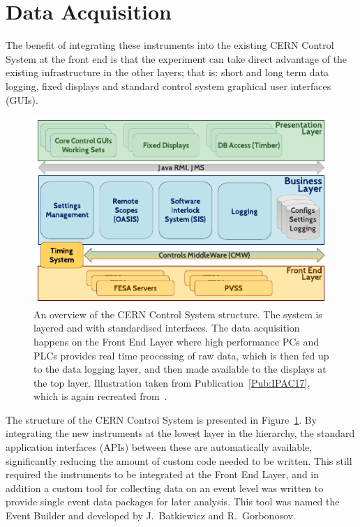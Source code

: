 \section{Data Acquisition}
\label{DAQ:DAQ}

The benefit of integrating these instruments into the existing CERN Control System at the front end is that the experiment can take direct advantage of the existing infrastructure in the other layers; that is: short and long term data logging, fixed displays and standard control system graphical user interfaces (GUIs).

\begin{figure}[hbt]
    \centering
    \includegraphics[width=0.85\linewidth,trim={0mm 0mm 0mm 0mm},clip]{figures/CERNControls}
    \caption{\label{Fig:DAQ:CERN}
        An overview of the CERN Control System structure.
        The system is layered and with standardised interfaces.
        The data acquisition happens on the Front End Layer where high performance PCs and PLCs provides real time processing of raw data, which is then fed up to the data logging layer, and then made available to the displays at the top layer.
        Illustration taken from Publication~\ref{Pub:IPAC17}, which is again recreated from~\cite{add:gorbonosov:2013}.
    }
\end{figure}

The structure of the CERN Control System is presented in Figure~\ref{Fig:DAQ:CERN}.
By integrating the new instruments at the lowest layer in the hierarchy, the standard application interfaces (APIs) between these are automatically available, significantly reducing the amount of custom code needed to be written.
This still required the instruments to be integrated at the Front End Layer, and in addition a custom tool for collecting data on an event level was written to provide single event data packages for later analysis.
This tool was named the Event Builder and developed by J.~Batkiewicz and R.~Gorbonosov.

